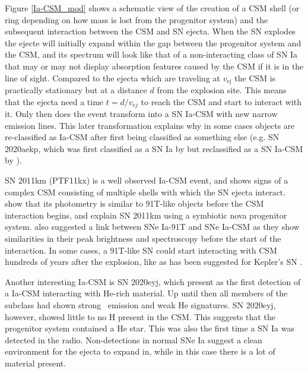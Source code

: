 \documentclass[a4paper,oneside,12pt, class=Latex/Classes/PhDthesisPSnPDF, crop=false]{standalone}
\begin{document}
Figure \ref{Ia-CSM_mod} shows a schematic view of the creation of a CSM shell (or ring depending on how mass is lost from the progenitor system) and the subsequent interaction between the CSM and SN ejecta. When the SN explodes the ejecte will initially expand within the gap between the progenitor system and the CSM, and its spectrum will look like that of a non-interacting class of SN Ia that may or may not display absorption features caused by the CSM if it is in the line of sight. Compared to the ejecta which are traveling at $v_\text{ej}$ the CSM is practically stationary but at a distance $d$ from the explosion site. This means that the ejecta need a time $t=d/v_{ej}$ to reach the CSM and start to interact with it. Only then does the event transform into a SN Ia-CSM with new narrow emission lines. This later transformation explains why in some cases objects are re-classified as Ia-CSM after first being classified as something else (e.g. SN 2020aekp, which was first classified as a SN Ia by \citealt{2020aekp_1st_classif} but reclassified as a SN Ia-CSM by \citealt{2020aekp_reclassif}).

SN 2011km (PTF11kx) is a well observed Ia-CSM event, and shows signs of a complex CSM consisting of multiple shells with which the SN ejecta interact. \citet{ptf11kx} show that its photometry is similar to 91T-like objects before the CSM interaction begins, and explain SN 2011km using a symbiotic nova progenitor system. \citet{Ia-CSM_and_91T_connection} also suggested a link between SNe Ia-91T and SNe Ia-CSM as they show  similarities in their peak brightness and spectroscopy before the start of the interaction. In some cases, a 91T-like SN could start interacting with CSM hundreds of years after the explosion, like as has been suggested for Kepler’s SN \citet{Kepler_91T, Kepler_CSM}.

Another interesting Ia-CSM is SN 2020eyj, which \citet{Kool_He_CSM} present as the first detection of a Ia-CSM interacting with He-rich material. Up until then all members of the subclass had shown strong \Halpha\ emission and weak He signatures. SN 2020eyj, however, showed little to no H present in the CSM. This suggests that the progenitor system contained a He star. This was also the first time a SN Ia was detected in the radio. Non-detections in normal SNe Ia suggest a clean environment for the ejecta to expand in, while in this case there is a lot of material present.
\end{document}
